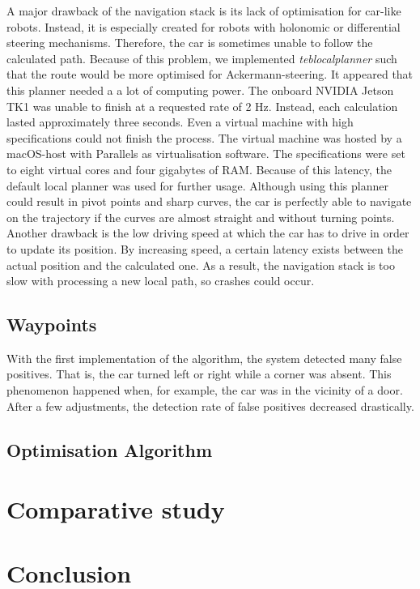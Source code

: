 \documentclass[conference,a4paper]{IEEEtran}
\begin{document}
A major drawback of the navigation stack is its lack of optimisation for car-like robots. Instead, it is especially created for robots with holonomic or differential steering mechanisms. Therefore, the car is sometimes unable to follow the calculated path. Because of this problem, we implemented \emph{teb\textunderscore local\textunderscore planner} such that the route would be more optimised for Ackermann-steering. It appeared that this planner needed a a lot of computing power. The onboard NVIDIA Jetson TK1 was unable to finish at a requested rate of 2 Hz. Instead, each calculation lasted approximately three seconds. Even a virtual machine with high specifications could not finish the process. The virtual machine was hosted by a macOS-host with Parallels as virtualisation software. The specifications were set to eight virtual cores and four gigabytes of RAM. Because of this latency, the default local planner was used for further usage. Although using this planner could result in pivot points and sharp curves, the car is perfectly able to navigate on the trajectory if the curves are almost straight and without turning points.
Another drawback is the low driving speed at which the car has to drive in order to update its position. By increasing speed, a certain latency exists between the actual position and the calculated one. As a result, the navigation stack is too slow with processing a new local path, so crashes could occur.

\subsection{Waypoints}
With the first implementation of the algorithm, the system detected many false positives. That is, the car turned left or right while a corner was absent. This phenomenon happened when, for example, the car was in the vicinity of a door. After a few adjustments, the detection rate of false positives decreased drastically. 

\subsection{Optimisation Algorithm}

\section{Comparative study}

\section{Conclusion}
\end{document}
